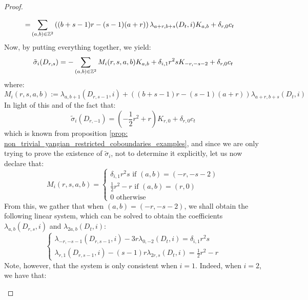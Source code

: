 \begin{proof}
\begin{enumerate}
$$\begin{aligned}
                                = & \sum_{(a, b) \in \mathbb{Z}^2} \left( (b + s - 1)r - (s - 1)(a + r) \right) \lambda_{a + r, b + s}(D_t, i) K_{a, b} + \delta_{r, 0} c_t
                            \end{aligned}
                        $$
                    Now, by putting everything together, we yield:
                        $$\tilde{\sigma}_i(D_{r, s}) = -\sum_{(a, b) \in \mathbb{Z}^2} M_i(r, s, a, b) K_{a, b} + \delta_{i, 1} r^2 s K_{-r, -s - 2} + \delta_{r, 0} c_t$$
                    where:
                        $$M_i(r, s, a, b) := \lambda_{a, b + 1}(D_{r, s - 1}, i) + \left( (b + s - 1)r - (s - 1)(a + r) \right) \lambda_{a + r, b + s}(D_t, i)$$
                    In light of this and of the fact that:
                        $$\tilde{\sigma}_i(D_{r, -1}) = (-\frac12 r^2 + r) K_{r, 0} + \delta_{r, 0} c_t$$
                    which is known from proposition \ref{prop: non_trivial_yangian_restricted_coboundaries_examples}, and since we are only trying to prove the existence of $\tilde{\sigma}_i$, not to determine it explicitly, let us now declare that:
                        $$
                            M_i(r, s, a, b) =
                            \begin{cases}
                                \text{$\delta_{i, 1} r^2 s$ if $(a, b) = (-r, -s - 2)$}
                                \\
                                \text{$\frac12 r^2 - r$ if $(a, b) = (r, 0)$}
                                \\
                                \text{$0$ otherwise}
                            \end{cases}
                        $$
                    From this, we gather that when $(a, b) = (-r, -s - 2)$, we shall obtain the following linear system, which can be solved to obtain the coefficients $\lambda_{a, b}(D_{r, s}, i)$ and $\lambda_{2a, b}(D_t, i)$:
                        $$
                            \begin{cases}
                                \lambda_{-r, -s - 1}(D_{r, s - 1}, i) -3r\lambda_{0, -2}(D_t, i) = \delta_{i, 1} r^2 s
                                \\
                                \lambda_{r, 1}(D_{r, s - 1}, i) - (s - 1)r\lambda_{2r, s}(D_t, i) = \frac12 r^2 - r
                            \end{cases}
                        $$
                    Note, however, that the system is only consistent when $i = 1$. Indeed, when $i = 2$, we have that:

\end{enumerate}
\end{proof}

